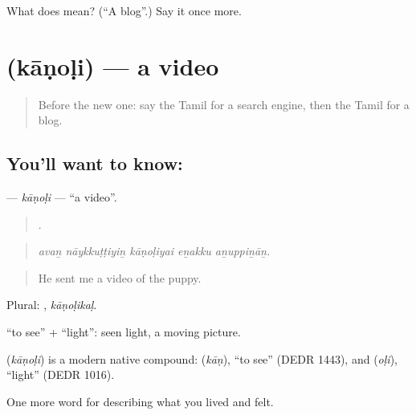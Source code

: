\begin{tcolorbox}[breakable,colback=teal!4,colframe=teal!35!black,title={Before you move on}]
What does  mean? (\textquotedblleft{}A blog\textquotedblright{}.) Say it once more.
\end{tcolorbox}
\section[\texorpdfstring{\ta{காணொளி} (kāṇoḷi)}{காணொளி (kāṇoḷi)}]{ (kāṇoḷi) — a video}

\label{lesson:TA-C516-kanoli}



\begin{quote}
Before the new one: say the Tamil for a search engine, then the Tamil for a blog.
\end{quote}

\subsection*{You'll want to know: }
\textbf{} — \emph{kāṇoḷi} — \textquotedblleft{}a video\textquotedblright{}.

\begin{quote}
    .
\end{quote}

\begin{quote}
\emph{avaṉ nāykkuṭṭiyiṉ kāṇoḷiyai eṉakku aṉuppiṉāṉ.}
\end{quote}

\begin{quote}
He sent me a video of the puppy.
\end{quote}

Plural: , \emph{kāṇoḷikaḷ}.

 \textquotedblleft{}to see\textquotedblright{} +  \textquotedblleft{}light\textquotedblright{}: seen light, a moving picture.

\begin{cousinweb}
\textbf{} (\emph{kāṇoḷi}) is a modern native compound:  (\emph{kāṇ}), \textquotedblleft{}to see\textquotedblright{} (DEDR 1443), and  (\emph{oḷi}), \textquotedblleft{}light\textquotedblright{} (DEDR 1016).
\end{cousinweb}

\begin{grammarlens}[title={What you've built}]
One more word for describing what you lived and felt.
\end{grammarlens}

